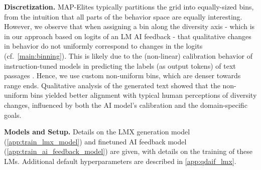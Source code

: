 \textbf{Discretization.}
MAP-Elites typically partitions the grid into equally-sized bins, from the intuition that all parts of the behavior space are equally interesting. However, we observe that when assigning a bin along the diversity axis - which is in our approach based on logits of an LM AI feedback - that qualitative changes in behavior do not uniformly correspond to changes in the logits (cf.~\cref{main:binning}). This is likely due to the (non-linear) calibration behavior of instruction-tuned models in predicting the labels (as output tokens) of text passages \citep{jiang2021can}. Hence, we use custom non-uniform bins, which are denser towards range ends. Qualitative analysis of the generated text showed that the non-uniform bins yielded better alignment with typical human perceptions of diversity changes, influenced by both the AI model's calibration and the domain-specific goals.

\textbf{Models and Setup.}
Details on the LMX generation model (\cref{app:train_lmx_model}) and finetuned AI feedback model (\cref{app:train_ai_feedback_model}) are given, with details on the training of these LMs. Additional default hyperparameters are described in \cref{app:qdaif_lmx}. 